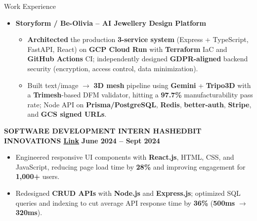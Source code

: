 \documentclass{resume}
\begin{document}
\begin{rSection}{Work Experience}
\begin{itemize}
    \item \textbf{Storyform / Be-Olivia -- AI Jewellery Design Platform}
    \begin{itemize}
        \item \textbf{Architected} the production \textbf{3-service system} (Express + TypeScript, FastAPI, React) on \textbf{GCP Cloud Run} with
\textbf{Terraform} IaC and \textbf{GitHub Actions} CI; independently designed \textbf{GDPR-aligned} backend security (encryption, access control, data
minimization).
        \item Built text/image $\rightarrow$ \textbf{3D mesh} pipeline using \textbf{Gemini} + \textbf{Tripo3D} with a \textbf{Trimesh}-based DFM
validator, hitting a \textbf{97.7\%} manufacturability pass rate; Node API on \textbf{Prisma/PostgreSQL}, \textbf{Redis}, \textbf{better-auth}, \textbf{Stripe}, and \textbf{GCS signed URLs}.
    \end{itemize}

\end{itemize}

\item \textbf{SOFTWARE DEVELOPMENT INTERN \textbar\hspace{.7mm} HASHEDBIT INNOVATIONS
\textbar\hspace{.7mm}\href{https://drive.google.com/file/d/1Q6l-CuH0VBkHkjfgwOHjLWbstiqjEasm/view?usp=sharing}{Link}} \hfill \textbf{June 2024 -- Sept 2024}
\begin{itemize}
    \item Engineered responsive UI components with \textbf{React.js}, HTML, CSS, and JavaScript, reducing page load time by \textbf{28\%} and improving engagement for \textbf{1,000+} users.
    \item Redesigned \textbf{CRUD APIs} with \textbf{Node.js} and \textbf{Express.js}; optimized SQL queries and indexing to cut average API response time by \textbf{36\%} (\textbf{500ms} $\rightarrow$ \textbf{320ms}).
\end{itemize}

\end{rSection}
\end{document}
